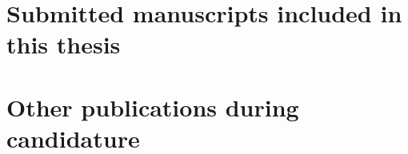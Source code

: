 




\section*{Submitted manuscripts included in this thesis}







\section*{Other publications during candidature}


